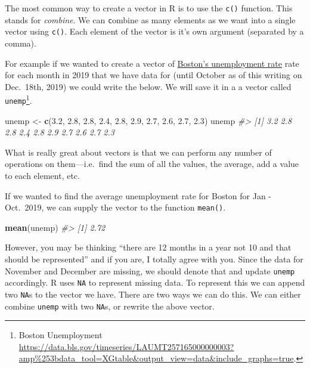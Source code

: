 \documentclass[
]{book}
\newenvironment{Shaded}{\begin{snugshade}}{\end{snugshade}}
\newcommand{\CommentTok}[1]{\textcolor[rgb]{0.56,0.35,0.01}{\textit{#1}}}
\newcommand{\FloatTok}[1]{\textcolor[rgb]{0.00,0.00,0.81}{#1}}
\newcommand{\KeywordTok}[1]{\textcolor[rgb]{0.13,0.29,0.53}{\textbf{#1}}}
\newcommand{\NormalTok}[1]{#1}
\newcommand{\StringTok}[1]{\textcolor[rgb]{0.31,0.60,0.02}{#1}}
\begin{document}
The most common way to create a vector in R is to use the \texttt{c()} function. This stands for \emph{combine}. We can \texttt{c}ombine as many elements as we want into a single vector using \texttt{c()}. Each element of the vector is it's own argument (separated by a comma).

For example if we wanted to create a vector of \href{https://data.bls.gov/timeseries/LAUMT257165000000003?amp\%253bdata_tool=XGtable\&output_view=data\&include_graphs=true}{Boston's unemployment rate} rate for each month in 2019 that we have data for (until October as of this writing on Dec.~18th, 2019) we could write the below. We will save it in a a vector called \texttt{unemp}\footnote{Boston Unemployment \url{https://data.bls.gov/timeseries/LAUMT257165000000003?amp\%253bdata_tool=XGtable\&output_view=data\&include_graphs=true}.}.

\begin{Shaded}
\begin{Highlighting}[]
\NormalTok{unemp \textless{}{-}}\StringTok{ }\KeywordTok{c}\NormalTok{(}\FloatTok{3.2}\NormalTok{, }\FloatTok{2.8}\NormalTok{, }\FloatTok{2.8}\NormalTok{, }\FloatTok{2.4}\NormalTok{, }\FloatTok{2.8}\NormalTok{, }\FloatTok{2.9}\NormalTok{, }\FloatTok{2.7}\NormalTok{, }\FloatTok{2.6}\NormalTok{, }\FloatTok{2.7}\NormalTok{, }\FloatTok{2.3}\NormalTok{)}
\NormalTok{unemp}
\CommentTok{\#\textgreater{}  [1] 3.2 2.8 2.8 2.4 2.8 2.9 2.7 2.6 2.7 2.3}
\end{Highlighting}
\end{Shaded}

What is really great about vectors is that we can perform any number of operations on them---i.e.~find the sum of all the values, the average, add a value to each element, etc.

If we wanted to find the average unemployment rate for Boston for Jan - Oct.~2019, we can supply the vector to the function \texttt{mean()}.

\begin{Shaded}
\begin{Highlighting}[]
\KeywordTok{mean}\NormalTok{(unemp)}
\CommentTok{\#\textgreater{} [1] 2.72}
\end{Highlighting}
\end{Shaded}

However, you may be thinking ``there are 12 months in a year not 10 and that should be represented'' and if you are, I totally agree with you. Since the data for November and December are missing, we should denote that and update \texttt{unemp} accordingly. R uses \texttt{NA} to represent missing data. To represent this we can append two \texttt{NA}s to the vector we have. There are two ways we can do this. We can either combine \texttt{unemp} with two \texttt{NA}s, or rewrite the above vector.
\end{document}
